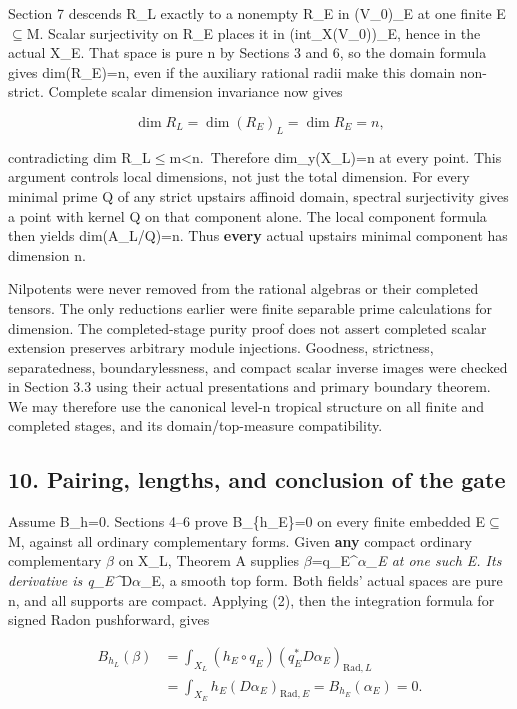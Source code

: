 \documentclass[
  10pt,
]{article}
\begin{document}
Section 7 descends R\_L exactly to a nonempty R\_E in (V\_0)\_E at one
finite E\ensuremath{\subseteq}M. Scalar surjectivity on R\_E places it in (int\_X(V\_0))\_E,
hence in the actual X\_E. That space is pure n by Sections 3 and 6, so
the domain formula gives dim(R\_E)=n, even if the auxiliary rational
radii make this domain non-strict. Complete scalar dimension invariance
now gives

\[
                    \dim R_L=\dim(R_E)_L=\dim R_E=n,
\]

contradicting dim R\_L\ensuremath{\le}m\textless n.~Therefore dim\_y(X\_L)=n at every
point. This argument controls local dimensions, not just the total
dimension. For every minimal prime Q of any strict upstairs affinoid
domain, spectral surjectivity gives a point with kernel Q on that
component alone. The local component formula then yields dim(A\_L/Q)=n.
Thus \textbf{every} actual upstairs minimal component has dimension n.

Nilpotents were never removed from the rational algebras or their
completed tensors. The only reductions earlier were finite separable
prime calculations for dimension. The completed-stage purity proof does
not assert completed scalar extension preserves arbitrary module
injections. Goodness, strictness, separatedness, boundarylessness, and
compact scalar inverse images were checked in Section 3.3 using their
actual presentations and primary boundary theorem. We may therefore use
the canonical level-n tropical structure on all finite and completed
stages, and its domain/top-measure compatibility.

\subsection{10. Pairing, lengths, and conclusion of the
gate}\label{pairing-lengths-and-conclusion-of-the-gate}

Assume B\_h=0. Sections 4--6 prove B\_\{h\_E\}=0 on every finite
embedded E\ensuremath{\subseteq}M, against all ordinary complementary forms. Given
\textbf{any} compact ordinary complementary \ensuremath{\beta} on X\_L, Theorem A
supplies \ensuremath{\beta}=q\_E\^{}\emph{\ensuremath{\alpha}\_E at one such E. Its derivative is
q\_E\^{}}D\ensuremath{\alpha}\_E, a smooth top form. Both fields' actual spaces are pure
n, and all supports are compact. Applying (2), then the integration
formula for signed Radon pushforward, gives

\[
 \begin{aligned}
 B_{h_L}(\beta)
 &=\int_{X_L}(h_E\circ q_E)(q_E^*D\alpha_E)_{\mathrm{Rad},L}\\
 &=\int_{X_E}h_E(D\alpha_E)_{\mathrm{Rad},E}
 =B_{h_E}(\alpha_E)=0.
 \end{aligned}                                             \tag{21}
\]
\end{document}
